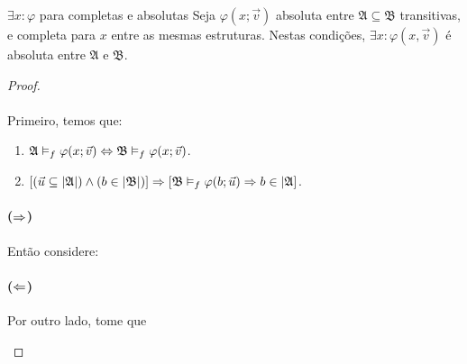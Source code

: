             \begin{theorem}{$\exists x:\varphi$ para completas e absolutas}
                Seja $\varphi(x;\vec v)$ absoluta entre $\mathfrak{A}\subseteq\mathfrak{B}$ transitivas, e 
                completa para $x$ entre as mesmas estruturas. Nestas condições, 
                $\exists x:\varphi(x,\vec v)$ é absoluta entre $\mathfrak{A}$ e $\mathfrak{B}$.
                \begin{proof}
                    \paragraph{}
                        Primeiro, temos que:
                    \begin{enumerate}[label=\alph*)]
                        \item $\mathfrak{A}\vDash_f\varphi(x;\vec v) \BIM \mathfrak{B}\vDash_f\varphi(x;\vec v)$.
                        \item $[(\vec u \subseteq|\mathfrak{A}|)\land(b\in|\mathfrak{B}|)]\RAR[\mathfrak{B}\vDash_f\varphi(b;\vec u) \RAR b\in|\mathfrak{A}]$.
                    \end{enumerate}
                    \paragraph{($\RAR$)}
                        Então considere:
                        \begin{prooftree}
                        \end{prooftree}
                    \paragraph{($\LAR$)}
                    Por outro lado, tome que
                        \begin{prooftree}
                        \end{prooftree}

\end{proof}
\end{theorem}
